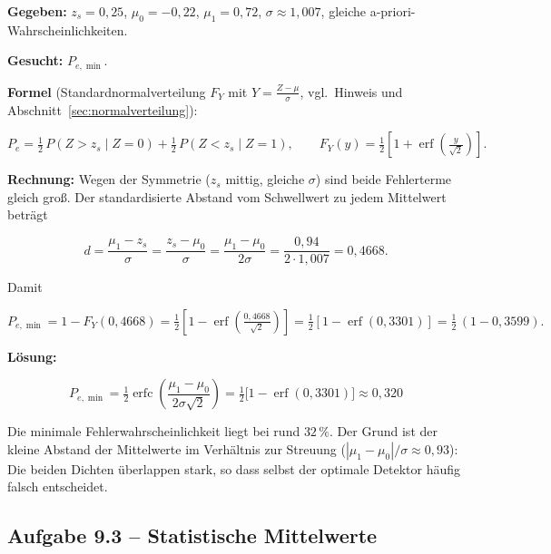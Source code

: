 \begin{beispiel}

\textbf{Gegeben:} $z_s = 0{,}25$, $\mu_0 = -0{,}22$, $\mu_1 = 0{,}72$,
$\sigma \approx 1{,}007$, gleiche a-priori-Wahrscheinlichkeiten.

\textbf{Gesucht:} $P_{e,\min}$.

\textbf{Formel} (Standardnormalverteilung $F_Y$ mit $Y = \tfrac{Z - \mu}{\sigma}$,
vgl.\ Hinweis und Abschnitt~\ref{sec:normalverteilung}):

$$
P_{e} = \tfrac{1}{2}\, P(Z > z_s \mid Z{=}0)
      + \tfrac{1}{2}\, P(Z < z_s \mid Z{=}1),
\qquad
F_Y(y) = \tfrac{1}{2}\!\left[1 + \operatorname{erf}\!\left(\tfrac{y}{\sqrt{2}}\right)\right].
$$

\textbf{Rechnung:} Wegen der Symmetrie ($z_s$ mittig, gleiche $\sigma$) sind
beide Fehlerterme gleich groß. Der standardisierte Abstand vom Schwellwert zu
jedem Mittelwert beträgt

$$
d = \frac{\mu_1 - z_s}{\sigma} = \frac{z_s - \mu_0}{\sigma}
= \frac{\mu_1 - \mu_0}{2\sigma}
= \frac{0{,}94}{2 \cdot 1{,}007} = 0{,}4668.
$$

Damit

$$
P_{e,\min} = 1 - F_Y(0{,}4668)
= \tfrac{1}{2}\!\left[1 - \operatorname{erf}\!\left(\tfrac{0{,}4668}{\sqrt{2}}\right)\right]
= \tfrac{1}{2}\!\left[1 - \operatorname{erf}(0{,}3301)\right]
= \tfrac{1}{2}\,(1 - 0{,}3599).
$$

\textbf{Lösung:}

$$
\boxed{\;P_{e,\min}
= \tfrac{1}{2}\operatorname{erfc}\!\left(\frac{\mu_1 - \mu_0}{2\sigma\sqrt{2}}\right)
= \tfrac{1}{2}\bigl[1 - \operatorname{erf}(0{,}3301)\bigr] \approx 0{,}320\;}
$$

Die minimale Fehlerwahrscheinlichkeit liegt bei rund $32\,\%$. Der Grund ist der
kleine Abstand der Mittelwerte im Verhältnis zur Streuung
($|\mu_1 - \mu_0|/\sigma \approx 0{,}93$): Die beiden Dichten überlappen stark,
so dass selbst der optimale Detektor häufig falsch entscheidet.

\end{beispiel}

\subsection*{Aufgabe 9.3 – Statistische Mittelwerte}

